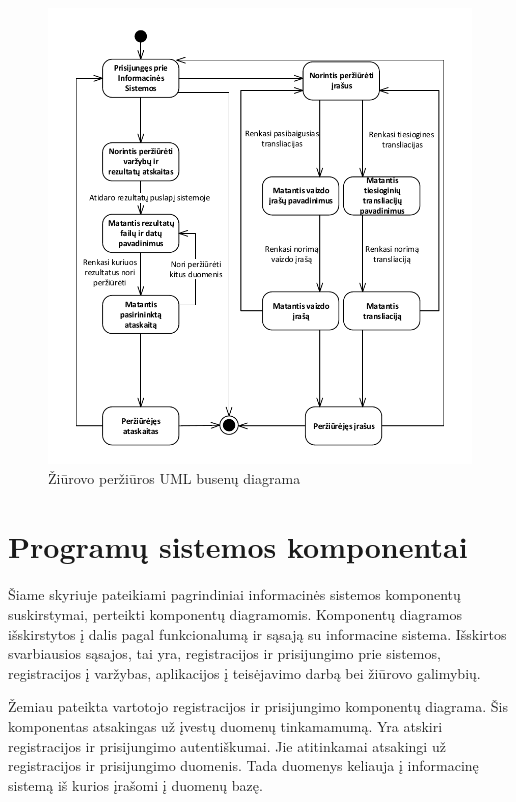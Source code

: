 \documentclass{VUMIFPSkursinis}
\begin{document}
		\begin{figure}[H]
			\centering
			\includegraphics[width=\textwidth]{img/BusenuDiagrama3}
			\caption{Žiūrovo peržiūros UML busenų diagrama}
			\label{fig:ZiurovoPerziurosUMLBusenuDiagrama}
		\end{figure}
		
    \section{Programų sistemos komponentai} \label{PSKomponentai}
        Šiame skyriuje pateikiami pagrindiniai informacinės sistemos komponentų suskirstymai, perteikti komponentų diagramomis.
		Komponentų diagramos išskirstytos į dalis pagal funkcionalumą ir sąsają su informacine sistema.
		Išskirtos svarbiausios sąsajos, tai yra, registracijos ir prisijungimo prie sistemos, registracijos į varžybas, aplikacijos į teisėjavimo darbą bei žiūrovo galimybių.
		\par
		\par
		Žemiau pateikta vartotojo registracijos ir prisijungimo komponentų diagrama.
		Šis komponentas atsakingas už įvestų duomenų tinkamamumą. 
		Yra atskiri registracijos ir prisijungimo autentiškumai. 
		Jie atitinkamai atsakingi už registracijos ir prisijungimo duomenis. 
		Tada duomenys keliauja į informacinę sistemą iš kurios įrašomi į duomenų bazę.
\end{document}
